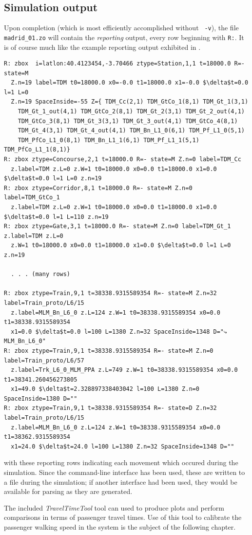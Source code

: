 \subsection{Simulation output}
\label{sec:metzimout}

Upon completion (which is most efficiently accomplished without {\tt
  -v}), the file {\tt madrid\_01.zo} will contain the \emph{reporting}
output, every row beginning with {\tt R:}. It is of course much
like the example reporting output exhibited in .

\begin{lstlisting}[mathescape]
R: zbox  i=latlon:40.4123454,-3.70466 ztype=Station,1,1 t=18000.0 R=- state=M
  Z.n=19 label=TDM t0=18000.0 x0=-0.0 t1=18000.0 x1=-0.0 $\delta$t=0.0 l=1 L=0
  Z.n=19 SpaceInside=-55 Z={ TDM_Cc(2,1) TDM_GtCo_1(8,1) TDM_Gt_1(3,1)
    TDM_Gt_1_out(4,1) TDM_GtCo_2(8,1) TDM_Gt_2(3,1) TDM_Gt_2_out(4,1)
    TDM_GtCo_3(8,1) TDM_Gt_3(3,1) TDM_Gt_3_out(4,1) TDM_GtCo_4(8,1)
    TDM_Gt_4(3,1) TDM_Gt_4_out(4,1) TDM_Bn_L1_0(6,1) TDM_Pf_L1_0(5,1)
    TDM_PfCo_L1_0(8,1) TDM_Bn_L1_1(6,1) TDM_Pf_L1_1(5,1) TDM_PfCo_L1_1(8,1)}
R: zbox ztype=Concourse,2,1 t=18000.0 R=- state=M Z.n=0 label=TDM_Cc
  z.label=TDM z.L=0 z.W=1 t0=18000.0 x0=0.0 t1=18000.0 x1=0.0 $\delta$t=0.0 l=1 L=0 z.n=19
R: zbox ztype=Corridor,8,1 t=18000.0 R=- state=M Z.n=0 label=TDM_GtCo_1
  z.label=TDM z.L=0 z.W=1 t0=18000.0 x0=0.0 t1=18000.0 x1=0.0 $\delta$t=0.0 l=1 L=110 z.n=19
R: zbox ztype=Gate,3,1 t=18000.0 R=- state=M Z.n=0 label=TDM_Gt_1 z.label=TDM z.L=0
  z.W=1 t0=18000.0 x0=0.0 t1=18000.0 x1=0.0 $\delta$t=0.0 l=1 L=0 z.n=19

  . . . (many rows)

R: zbox ztype=Train,9,1 t=38338.9315589354 R=- state=M Z.n=32 label=Train_proto/L6/15
  z.label=MLM_Bn_L6_0 z.L=124 z.W=1 t0=38338.9315589354 x0=0.0 t1=38338.9315589354
  x1=0.0 $\delta$t=0.0 l=100 L=1380 Z.n=32 SpaceInside=1348 D="⤷ MLM_Bn_L6_0"
R: zbox ztype=Train,9,1 t=38338.9315589354 R=- state=M Z.n=0 label=Train_proto/L6/57
  z.label=Trk_L6_0_MLM_PPA z.L=749 z.W=1 t0=38338.9315589354 x0=0.0 t1=38341.260456273805
  x1=49.0 $\delta$t=2.328897338403042 l=100 L=1380 Z.n=0 SpaceInside=1380 D=""
R: zbox ztype=Train,9,1 t=38338.9315589354 R=- state=D Z.n=32 label=Train_proto/L6/15
  z.label=MLM_Bn_L6_0 z.L=124 z.W=1 t0=38338.9315589354 x0=0.0 t1=38362.9315589354
  x1=24.0 $\delta$t=24.0 l=100 L=1380 Z.n=32 SpaceInside=1348 D=""  
\end{lstlisting}
with these reporting rows indicating each  movement which occured during the
simulation. Since the command-line interface has been used, these are written to a file during
the simulation; if another interface had been used, they would be available for parsing as
they are generated.

The included \emph{TravelTimeTool} tool can used to produce plots and perform comparisons
in terms of passenger travel times. Use of this tool to calibrate the passenger walking
speed in the system is the subject of the following chapter.



